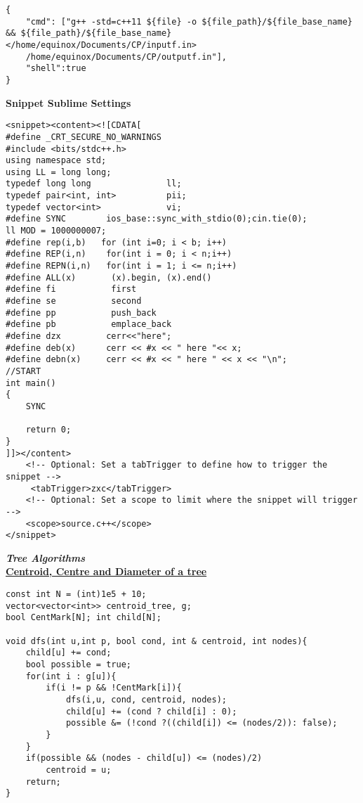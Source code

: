 \documentclass[10pt,a4paper]{report}
\begin{document}
\begin{landscape}
\begin{multicols}{2}
\begin{verbatim}
{
	"cmd": ["g++ -std=c++11 ${file} -o ${file_path}/${file_base_name} && ${file_path}/${file_base_name}</home/equinox/Documents/CP/inputf.in>	
	/home/equinox/Documents/CP/outputf.in"],
	"shell":true
}
\end{verbatim}

\begin{flushleft}
\textbf{Snippet Sublime Settings}
\end{flushleft}

\begin{verbatim}
<snippet><content><![CDATA[
#define _CRT_SECURE_NO_WARNINGS
#include <bits/stdc++.h>
using namespace std;
using LL = long long; 
typedef long long               ll;
typedef pair<int, int>          pii;
typedef vector<int>             vi;
#define SYNC		ios_base::sync_with_stdio(0);cin.tie(0); 
ll MOD = 1000000007;
#define rep(i,b)   for (int i=0; i < b; i++)
#define REP(i,n) 	for(int i = 0; i < n;i++)
#define REPN(i,n) 	for(int i = 1; i <= n;i++)
#define ALL(x)  	 (x).begin, (x).end()
#define fi           first
#define se           second
#define pp           push_back
#define pb 		     emplace_back
#define dzx 		cerr<<"here";
#define deb(x)		cerr << #x << " here "<< x;
#define debn(x)		cerr << #x << " here " << x << "\n"; 
//START
int main()
{
	SYNC
	
	return 0;
}
]]></content>
	<!-- Optional: Set a tabTrigger to define how to trigger the snippet -->
	 <tabTrigger>zxc</tabTrigger> 
	<!-- Optional: Set a scope to limit where the snippet will trigger -->
	<scope>source.c++</scope> 
</snippet>
\end{verbatim}


\begin{flushleft}
\textbf{\textit{Tree Algorithms}}\\
\textbf{\underline{Centroid, Centre and Diameter of a tree}}\\
\end{flushleft}

\begin{verbatim}
const int N = (int)1e5 + 10;
vector<vector<int>> centroid_tree, g;
bool CentMark[N]; int child[N];  

void dfs(int u,int p, bool cond, int & centroid, int nodes){
	child[u] += cond;
	bool possible = true;  	
	for(int i : g[u]){
		if(i != p && !CentMark[i]){
			dfs(i,u, cond, centroid, nodes);
			child[u] += (cond ? child[i] : 0); 
			possible &= (!cond ?((child[i]) <= (nodes/2)): false);
		}
	}
	if(possible && (nodes - child[u]) <= (nodes)/2)
		centroid = u; 
	return;
}


\end{verbatim}
\end{multicols}
\end{landscape}
\end{document}
